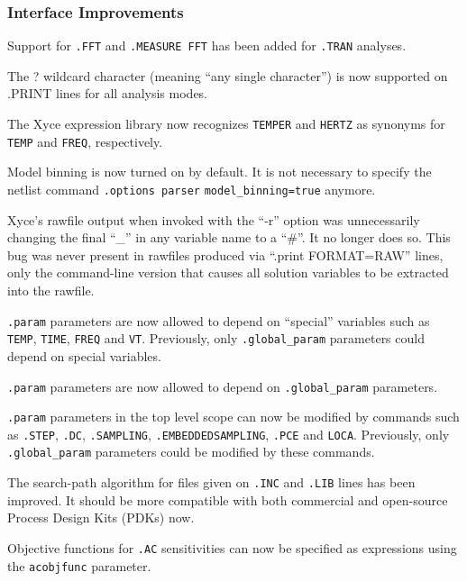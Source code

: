 \documentclass[letterpaper]{scrartcl}
\begin{document}
\subsubsection*{Interface Improvements}
\begin{XyceItemize}
  \item Support for \texttt{.FFT} and \texttt{.MEASURE FFT} has been
    added for \texttt{.TRAN} analyses.
  \item The ? wildcard character (meaning ``any single character'') is
    now supported on .PRINT lines for all analysis modes.
  \item The Xyce expression library now recognizes \texttt{TEMPER} and
    \texttt{HERTZ} as synonyms for \texttt{TEMP} and \texttt{FREQ},
    respectively.
  \item Model binning is now turned on by default.  It is not
    necessary to specify the netlist command \texttt{.options parser}
    \texttt{model\_binning=true} anymore.
  \item Xyce's rawfile output when invoked with the ``-r'' option was
    unnecessarily changing the final ``\_'' in any variable name to a
    ``\#''.  It no longer does so.  This bug was never present in
    rawfiles produced via ``.print FORMAT=RAW'' lines, only the
    command-line version that causes all solution variables to be
    extracted into the rawfile.
  \item \texttt{.param} parameters are now allowed to depend on ``special'' variables 
    such as \texttt{TEMP}, \texttt{TIME}, \texttt{FREQ} and \texttt{VT}.  
    Previously, only \texttt{.global\_param} parameters could depend on special variables. 
  \item \texttt{.param} parameters are now allowed to depend on \texttt{.global\_param} parameters.
  \item \texttt{.param} parameters in the top level scope can now be modified by commands such as \texttt{.STEP}, \texttt{.DC}, \texttt{.SAMPLING}, \texttt{.EMBEDDEDSAMPLING}, \texttt{.PCE} and \texttt{LOCA}.  Previously, only \texttt{.global\_param} parameters could be modified by these commands.
  \item The search-path algorithm for files given on \texttt{.INC} and
     \texttt{.LIB} lines has been improved.  It should be more compatible
     with both commercial and open-source Process Design Kits (PDKs) now.
  \item Objective functions for \texttt{.AC} sensitivities can now be specified as expressions using the \texttt{acobjfunc} parameter.
\end{XyceItemize}
\end{document}
